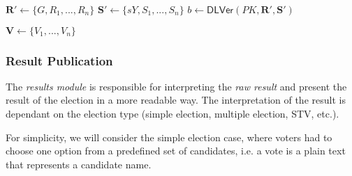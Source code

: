 \begin{algorithm}[ht]
    \DontPrintSemicolon
    \caption{$\mathsf{PartialDecryptionVer}(\boldsymbol{e}, \boldsymbol{S}, PK, sY)$}
    \label{alg: partial decryption ver}
    
    $\boldsymbol{R}' \gets \{G, R_1, ..., R_n\}$ \;
    $\boldsymbol{S}' \gets \{sY, S_1, ..., S_n\}$ \;
    $b \gets \mathsf{DLVer}(PK, \boldsymbol{R}', \boldsymbol{S}')$ 
     
\end{algorithm}

\begin{algorithm}[ht]
    \DontPrintSemicolon
    \caption{$\mathsf{FinalizeDecryption} (\boldsymbol{e}, \{ \boldsymbol{S}_i | i \in \tau \})$}
    \label{alg: finalize decryption}
    
    $\boldsymbol{V} \gets \{ V_1, ..., V_n \}$ \;
     
\end{algorithm}


\subsubsection{Result Publication} \label{sec: result publication}
The \textit{results module} is responsible for interpreting the \textit{raw result} and present the result of the election in a more readable way. The interpretation of the result is dependant on the election type (simple election, multiple election, STV, etc.).

For simplicity, we will consider the simple election case, where voters had to choose one option from a predefined set of candidates, i.e. a vote is a plain text that represents a candidate name.

